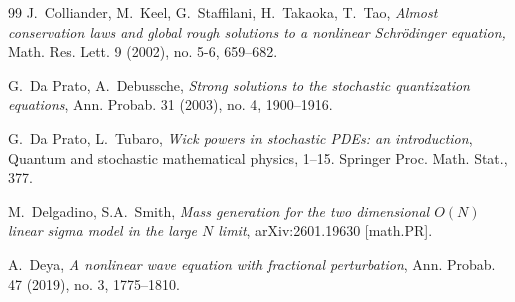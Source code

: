 \documentclass[letterpaper, 11pt,  reqno]{amsart}
\newcommand{\1}{\hspace{0.5mm}\text{I}\hspace{0.2mm}}
\numberwithin{equation}{section}
\numberwithin{theorem}{section}
\begin{document}
\begin{thebibliography}{99}
J.~Colliander, M.~Keel, G.~Staffilani, H.~Takaoka, T.~Tao, 
{\it  Almost conservation laws and global rough solutions to a nonlinear Schr\"odinger equation,} Math. Res. Lett. 9 (2002), no. 5-6, 659--682.




%
%
%






G.~Da Prato, A.~Debussche,
{\it Strong solutions to the stochastic quantization equations}, 
Ann. Probab. 31 (2003), no. 4, 1900--1916.


G.~Da Prato, L.~Tubaro,
{\it Wick powers in stochastic PDEs: an introduction}, 
Quantum and stochastic mathematical physics, 1--15.
Springer Proc. Math. Stat., 377.


M.~Delgadino, S.A.~Smith,
{\it Mass generation
for the two dimensional $O(N)$
linear sigma model in the large $N$ limit}, 
arXiv:2601.19630 [math.PR].




%
%
%


A.~Deya, 
{\it A nonlinear wave equation with fractional perturbation},
 Ann. Probab. 47 (2019), no. 3, 1775--1810.

%
%
%


\end{thebibliography}
\end{document}
